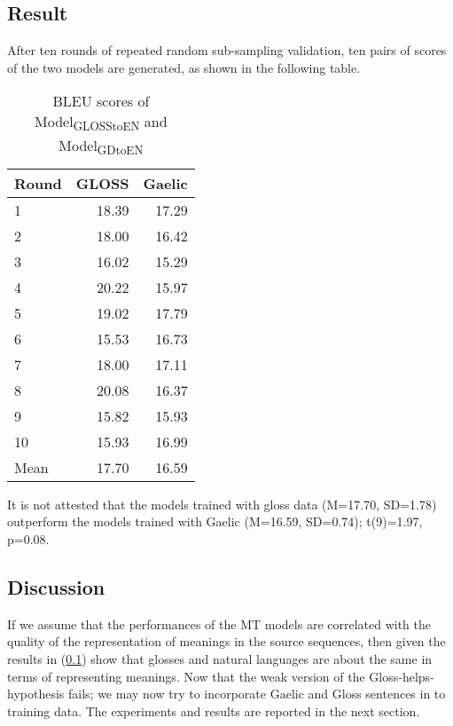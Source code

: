 \documentclass[a4paper]{article}
\begin{document}
\subsection{Result} \label{gdglen_results}
After ten rounds of repeated random sub-sampling validation, ten pairs of scores of the two models are generated, as shown in the following table. 


\begin{table}[ht]
\centering
\begin{tabular}{lrr}
  \hline
Round & GLOSS & Gaelic \\ 
  \hline
1 & 18.39 & 17.29 \\ 
  2 & 18.00 & 16.42 \\ 
  3 & 16.02 & 15.29 \\ 
  4 & 20.22 & 15.97 \\ 
  5 & 19.02 & 17.79 \\ 
  6 & 15.53 & 16.73 \\ 
  7 & 18.00 & 17.11 \\ 
  8 & 20.08 & 16.37 \\ 
  9 & 15.82 & 15.93 \\ 
  10 & 15.93 & 16.99 \\ 
   \hline
Mean & 17.70 & 16.59 \\ 
   \hline
\end{tabular}
\caption{BLEU scores of Model\textsubscript{GLOSStoEN} and Model\textsubscript{GDtoEN}} 
\label{Table:BLEUGlossGD}
\end{table}
It is not attested that the models trained with gloss data (M=17.70, SD=1.78) outperform the models trained with Gaelic (M=16.59, SD=0.74); t(9)=1.97, p=0.08.

\subsection{Discussion}
If we assume that the performances of the MT models are correlated with the quality of the representation of meanings in the source sequences, then given the results in (\ref{gdglen_results}) show that glosses and natural languages are about the same in terms of representing meanings. 
Now that the weak version of the Gloss-helps-hypothesis fails; we may now try to incorporate Gaelic and Gloss sentences in to training data. The experiments and results are reported in the next section. 

\end{document}
